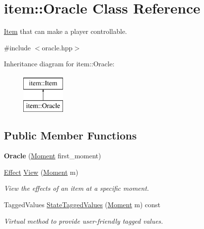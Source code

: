 \hypertarget{classitem_1_1_oracle}{}\section{item\+:\+:Oracle Class Reference}
\label{classitem_1_1_oracle}


\hyperlink{classitem_1_1_item}{Item} that can make a player controllable.  




{\ttfamily \#include $<$oracle.\+hpp$>$}

Inheritance diagram for item\+:\+:Oracle\+:\begin{figure}[H]
\begin{center}
\leavevmode
\includegraphics[height=2.000000cm]{classitem_1_1_oracle}
\end{center}
\end{figure}
\subsection*{Public Member Functions}
\begin{DoxyCompactItemize}
\item 
\mbox{\label{classitem_1_1_oracle_aef8394c1370b0cf661b84ea454cff536}} 
{\bfseries Oracle} (\hyperlink{classtimeplane_1_1_moment}{Moment} first\+\_\+moment)
\item 
\hyperlink{classitem_1_1_effect}{Effect} \hyperlink{classitem_1_1_oracle_a9982f1934a769cc461246bab31b8a72d}{View} (\hyperlink{classtimeplane_1_1_moment}{Moment} m)
\begin{DoxyCompactList}\small\item\em View the effects of an item at a specific moment. \end{DoxyCompactList}\item 
Tagged\+Values \hyperlink{classitem_1_1_oracle_a78dd3984a5a0dae432c86e18520d7c46}{State\+Tagged\+Values} (\hyperlink{classtimeplane_1_1_moment}{Moment} m) const
\begin{DoxyCompactList}\small\item\em Virtual method to provide user-\/friendly tagged values. \end{DoxyCompactList}\end{DoxyCompactItemize}
